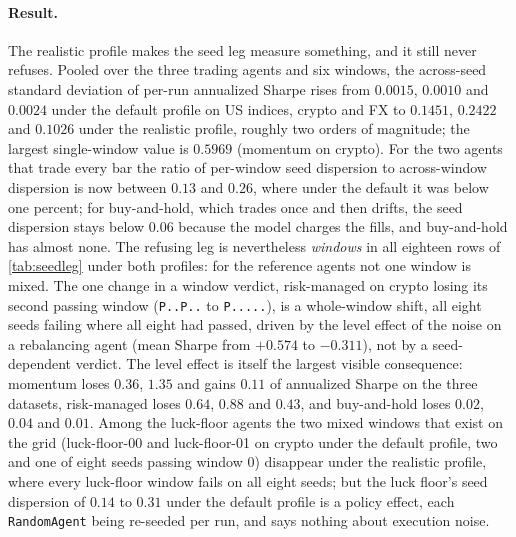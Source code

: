 \paragraph{Result.} The realistic profile makes the seed leg measure something, and it still never refuses. Pooled over the three trading agents and six windows, the across-seed standard deviation of per-run annualized Sharpe rises from $0.0015$, $0.0010$ and $0.0024$ under the default profile on US indices, crypto and FX to $0.1451$, $0.2422$ and $0.1026$ under the realistic profile, roughly two orders of magnitude; the largest single-window value is $0.5969$ (momentum on crypto). For the two agents that trade every bar the ratio of per-window seed dispersion to across-window dispersion is now between $0.13$ and $0.26$, where under the default it was below one percent; for buy-and-hold, which trades once and then drifts, the seed dispersion stays below $0.06$ because the model charges the fills, and buy-and-hold has almost none. The refusing leg is nevertheless \emph{windows} in all eighteen rows of \cref{tab:seedleg} under both profiles: for the reference agents not one window is mixed. The one change in a window verdict, risk-managed on crypto losing its second passing window (\texttt{P..P..} to \texttt{P.....}), is a whole-window shift, all eight seeds failing where all eight had passed, driven by the level effect of the noise on a rebalancing agent (mean Sharpe from $+0.574$ to $-0.311$), not by a seed-dependent verdict. The level effect is itself the largest visible consequence: momentum loses $0.36$, $1.35$ and gains $0.11$ of annualized Sharpe on the three datasets, risk-managed loses $0.64$, $0.88$ and $0.43$, and buy-and-hold loses $0.02$, $0.04$ and $0.01$. Among the luck-floor agents the two mixed windows that exist on the grid (luck-floor-00 and luck-floor-01 on crypto under the default profile, two and one of eight seeds passing window 0) disappear under the realistic profile, where every luck-floor window fails on all eight seeds; but the luck floor's seed dispersion of $0.14$ to $0.31$ under the default profile is a policy effect, each \texttt{RandomAgent} being re-seeded per run, and says nothing about execution noise.

